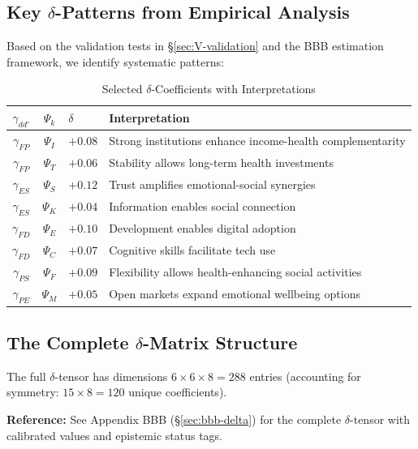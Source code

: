 \subsection{Key $\delta$-Patterns from Empirical Analysis}

Based on the validation tests in \S\ref{sec:V-validation} and the BBB estimation 
framework, we identify systematic patterns:

\begin{table}[htbp]
\centering
\caption{Selected $\delta$-Coefficients with Interpretations}
\label{tab:V-delta-selected}
\small
\renewcommand{\arraystretch}{1.2}
\begin{tabular}{@{}cclp{5cm}@{}}
\toprule
\textbf{$\gamma_{dd'}$} & \textbf{$\Psi_k$} & \textbf{$\delta$} & \textbf{Interpretation} \\
\midrule
$\gamma_{FP}$ & $\Psi_I$ & $+0.08$ & Strong institutions enhance income-health complementarity \\
$\gamma_{FP}$ & $\Psi_T$ & $+0.06$ & Stability allows long-term health investments \\
$\gamma_{ES}$ & $\Psi_S$ & $+0.12$ & Trust amplifies emotional-social synergies \\
$\gamma_{ES}$ & $\Psi_K$ & $+0.04$ & Information enables social connection \\
$\gamma_{FD}$ & $\Psi_E$ & $+0.10$ & Development enables digital adoption \\
$\gamma_{FD}$ & $\Psi_C$ & $+0.07$ & Cognitive skills facilitate tech use \\
$\gamma_{PS}$ & $\Psi_F$ & $+0.09$ & Flexibility allows health-enhancing social activities \\
$\gamma_{PE}$ & $\Psi_M$ & $+0.05$ & Open markets expand emotional wellbeing options \\
\bottomrule
\end{tabular}
\end{table}

\subsection{The Complete $\delta$-Matrix Structure}

The full $\delta$-tensor has dimensions $6 \times 6 \times 8 = 288$ entries 
(accounting for symmetry: $15 \times 8 = 120$ unique coefficients).

\textbf{Reference:} See Appendix BBB (\S\ref{sec:bbb-delta}) for the complete 
$\delta$-tensor with calibrated values and epistemic status tags.

